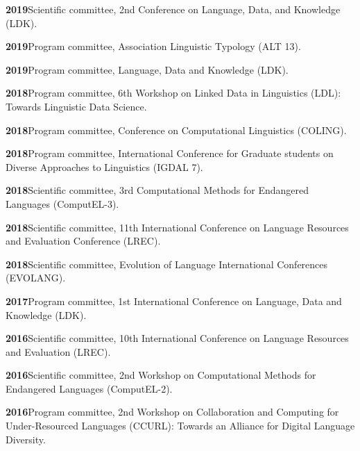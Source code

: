 \documentclass[11pt]{article}
\newcommand{\hangpara}{
 \setlength{\parindent}{0in} %
 \hangindent=0.42in %
}
\begin{document}
\vskip 6pt
\hangpara
{\bf 2019}\hspace{1ex}Scientific committee, 2nd Conference on Language, Data, and Knowledge (LDK).

\vskip 6pt
\hangpara
{\bf 2019}\hspace{1ex}Program committee, Association Linguistic Typology (ALT 13).

\vskip 6pt
\hangpara
{\bf 2019}\hspace{1ex}Program committee, Language, Data and Knowledge (LDK).

\vskip 6pt
\hangpara
{\bf 2018}\hspace{1ex}Program committee, 6th Workshop on Linked Data in Linguistics (LDL): Towards Linguistic Data Science.

\vskip 6pt
\hangpara
{\bf 2018}\hspace{1ex}Program committee, Conference on Computational Linguistics (COLING).

\vskip 6pt
\hangpara
{\bf 2018}\hspace{1ex}Program committee, International Conference for Graduate students on Diverse Approaches to Linguistics (IGDAL 7).

\vskip 6pt
\hangpara
{\bf 2018}\hspace{1ex}Scientific committee, 3rd Computational Methods for Endangered Languages (ComputEL-3).

\vskip 6pt
\hangpara
{\bf 2018}\hspace{1ex}Scientific committee, 11th International Conference on Language Resources and Evaluation Conference (LREC).

\vskip 6pt
\hangpara
{\bf 2018}\hspace{1ex}Scientific committee, Evolution of Language International Conferences (EVOLANG).

\vskip 6pt
\hangpara
{\bf 2017}\hspace{1ex}Program committee, 1st International Conference on Language, Data and Knowledge (LDK).

\vskip 6pt
\hangpara
{\bf 2016}\hspace{1ex}Scientific committee, 10th International Conference on Language Resources and Evaluation (LREC).

\vskip 6pt
\hangpara
{\bf 2016}\hspace{1ex}Scientific committee, 2nd Workshop on Computational Methods for Endangered Languages (ComputEL-2).

\vskip 6pt
\hangpara
{\bf 2016}\hspace{1ex}Program committee, 2nd Workshop on Collaboration and Computing for Under-Resourced Languages (CCURL): Towards an Alliance for Digital Language Diversity.
\end{document}
